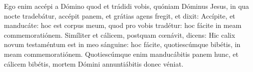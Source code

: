 Ego enim accépi a Dómino quod et trádidi vobis,
	quóniam Dóminus Jesus, in qua nocte tradebátur, accépit panem,
	et grátias agens fregit, et dixit:
	Accípite, et manducáte: hoc est corpus meum, quod pro vobis tradétur:
	hoc fácite in meam commemoratiónem.
Simíliter et cálicem, postquam cœnávit, dicens:
	Hic calix novum testaméntum est in meo sánguine:
	hoc fácite, quotiescúmque bibétis, in meam commemoratiónem.
Quotiescúmque enim manducábitis panem hunc, et cálicem bibétis,
	mortem Dómini annuntiábitis donec véniat.
